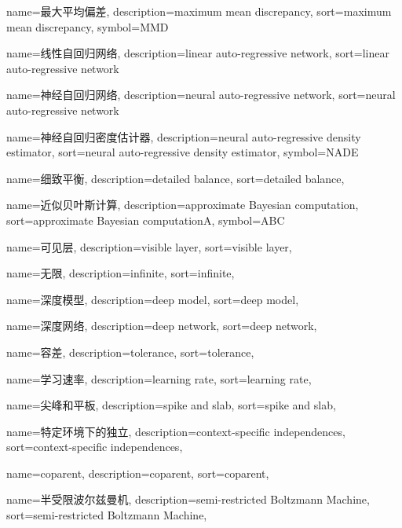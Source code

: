{
  name=最大平均偏差,
  description={maximum mean discrepancy},
  sort={maximum mean discrepancy},
  symbol={MMD}
}

{
  name=线性自回归网络,
  description={linear auto-regressive network},
  sort={linear auto-regressive network}
}

{
  name=神经自回归网络,
  description={neural auto-regressive network},
  sort={neural auto-regressive network}
}

{
  name=神经自回归密度估计器,
  description={neural auto-regressive density estimator},
  sort={neural auto-regressive density estimator},
  symbol={NADE}
}

{
  name=细致平衡,
  description={detailed balance},
  sort={detailed balance},
}

{
  name=近似贝叶斯计算,
  description={approximate Bayesian computation},
  sort={approximate Bayesian computationA},
  symbol={ABC}
}

{
  name=可见层,
  description={visible layer},
  sort={visible layer},
}

{
  name=无限,
  description={infinite},
  sort={infinite},
}

{
  name=深度模型,
  description={deep model},
  sort={deep model},
}

{
  name=深度网络,
  description={deep network},
  sort={deep network},
}

{
  name=容差,
  description={tolerance},
  sort={tolerance},
}

{
  name=学习速率,
  description={learning rate},
  sort={learning rate},
}

{
  name=尖峰和平板,
  description={spike and slab},
  sort={spike and slab},
}

{
  name=特定环境下的独立,
  description={context-specific independences},
  sort={context-specific independences},
}

{
  name=coparent,
  description={coparent},
  sort={coparent},
}

{
  name=半受限波尔兹曼机,
  description={semi-restricted Boltzmann Machine},
  sort={semi-restricted Boltzmann Machine},
}

